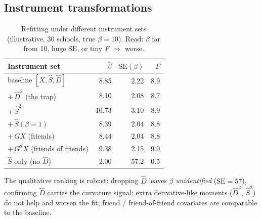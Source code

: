 \documentclass[11pt]{article}
\begin{document}
\subsection{Instrument transformations}\label{sec:instr}
\begin{table}[h]\centering\small
\caption{Refitting under different instrument sets (illustrative, 30 schools, true $\beta=10$). Read: $\beta$ far from 10, huge $\mathrm{SE}$, or tiny $F$ $\Rightarrow$ worse.}
\begin{tabular}{lrrr}
\toprule
Instrument set & $\widehat\beta$ & $\mathrm{SE}(\beta)$ & $F$ \\
\midrule
baseline $[X,\widehat S,\widehat D]$ & 8.85 & 2.22 & 8.9 \\
$+\,\widehat D^2$ (the trap) & 8.10 & 2.08 & 8.7 \\
$+\,\widehat S^2$ & 10.73 & 3.10 & 8.9 \\
$+\,\widehat S(\beta{=}1)$ & 8.39 & 2.04 & 8.8 \\
$+\,GX$ (friends) & 8.44 & 2.04 & 8.8 \\
$+\,G^2X$ (friends of friends) & 9.38 & 2.15 & 9.0 \\
$\widehat S$ only (no $\widehat D$) & 2.00 & 57.2 & 0.5 \\
\bottomrule
\end{tabular}
\end{table}
The qualitative ranking is robust: dropping $\widehat D$ leaves $\beta$ \emph{unidentified} ($\mathrm{SE}=57$), confirming $\widehat D$ carries the curvature signal; extra derivative-like moments ($\widehat D^2$, $\widehat S^2$) do not help and worsen the fit; friend / friend-of-friend covariates are comparable to the baseline.
\end{document}
